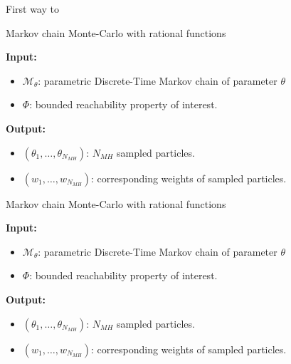 First way to
\begin{algorithm}[H]
      \caption{Markov chain Monte-Carlo with rational functions}
      \label{rf-mcmc-alg}
      \hspace*{\algorithmicindent} \textbf{Input:}
      \begin{itemize}
            \item $\mathcal{M}_\theta$: parametric Discrete-Time Markov chain of parameter $\theta$
            \item $\Phi$: bounded reachability property of interest.
      \end{itemize}
      \hspace*{\algorithmicindent} \textbf{Output:}
      \begin{itemize}
            \item $(\theta_1,\ldots,\theta_{N_{MH}})$: $N_{MH}$ sampled particles.
            \item $(w_1,\ldots,w_{N_{MH}})$: corresponding weights of sampled particles.
      \end{itemize}
      \begin{algorithmic}[1]

            \EndProcedure
      \end{algorithmic}
\end{algorithm}


\begin{algorithm}[H]
      \caption{Markov chain Monte-Carlo with rational functions}
      \label{rf-mcmc-alg}
      \hspace*{\algorithmicindent} \textbf{Input:}
      \begin{itemize}
            \item $\mathcal{M}_\theta$: parametric Discrete-Time Markov chain of parameter $\theta$
            \item $\Phi$: bounded reachability property of interest.
      \end{itemize}
      \hspace*{\algorithmicindent} \textbf{Output:}
      \begin{itemize}
            \item $(\theta_1,\ldots,\theta_{N_{MH}})$: $N_{MH}$ sampled particles.
            \item $(w_1,\ldots,w_{N_{MH}})$: corresponding weights of sampled particles.
      \end{itemize}
      \begin{algorithmic}[1]
            \EndProcedure
      \end{algorithmic}
\end{algorithm}


